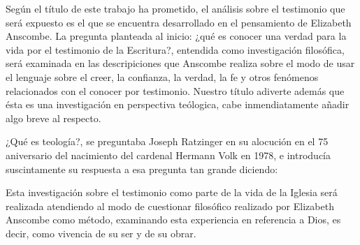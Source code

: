       Según el título de este trabajo ha prometido, el análisis sobre el testimonio
      que será expuesto es el que se encuentra desarrollado en el pensamiento de
      Elizabeth Anscombe. La pregunta planteada al inicio: ¿qué es conocer una verdad
      para la vida por el testimonio de la Escritura?, entendida como investigación
      filosófica, será examinada en las descripiciones que Anscombe realiza sobre el
      modo de usar el lenguaje sobre el creer, la confianza, la verdad, la fe y otros
      fenómenos relacionados con el conocer por testimonio. Nuestro título adiverte
      además que ésta es una investigación en perspectiva teólogica, cabe
      inmendiatamente añadir algo breve al respecto.

      ¿Qué es teología?, se preguntaba Joseph Ratzinger en su alocución en el 75
      aniversario del nacimiento del cardenal Hermann Volk en 1978, e introducía
      suscintamente su respuesta a esa pregunta tan grande diciendo:

      Esta investigación sobre el testimonio como parte de la vida de la Iglesia será
      realizada atendiendo al modo de cuestionar filosófico realizado por Elizabeth
      Anscombe como método, examinando esta experiencia en referencia a Dios, es
      decir, como vivencia de su ser y de su obrar.

